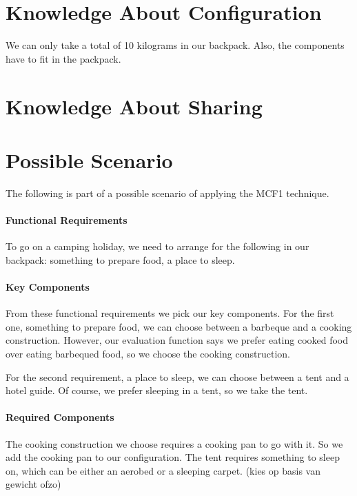 \documentclass[a4paper,11pt]{article}
\begin{document}
\section*{Knowledge About Configuration}

We can only take a total of 10 kilograms in our backpack.
Also, the components have to fit in the packpack.


\section*{Knowledge About Sharing}


\section*{Possible Scenario}

The following is part of a possible scenario of applying the
MCF1 technique.

\paragraph{Functional Requirements}

To go on a camping holiday, we need to arrange for the following
in our backpack: something to prepare food, a place to sleep.

\paragraph{Key Components}

From these functional requirements we pick our key components. For
the first one, something to prepare food, we can choose between a
barbeque and a cooking construction. However, our evaluation
function says we prefer eating cooked food over eating barbequed
food, so we choose the cooking construction.

For the second requirement, a place to sleep, we can choose between
a tent and a hotel guide. Of course, we prefer sleeping in a tent,
so we take the tent.

\paragraph{Required Components}

The cooking construction we choose requires a cooking pan to go
with it. So we add the cooking pan to our configuration. The tent
requires something to sleep on, which can be either an aerobed or
a sleeping carpet. (kies op basis van gewicht ofzo)
\end{document}
